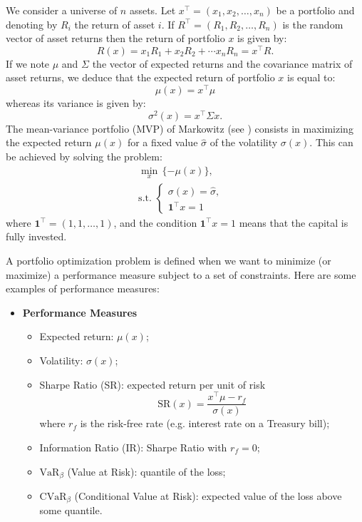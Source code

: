 We consider a universe of $n$ assets. Let $x^\top = (x_1, x_2, \dots, x_n)$ be a portfolio and denoting by $R_i$ the return of asset $i$. If $R^\top=(R_1, R_2, \dots, R_n)$  is the random vector of asset returns then the return of portfolio $x$ is given by:
\[
	R(x) = x_1R_1+x_2R_2+\cdots x_nR_n = x^\top R.
\]
If we note $\mu$ and $\Sigma$ the vector of expected returns and the covariance matrix of asset returns, we deduce that the expected return of portfolio $x$ is equal to:
\[
	\mu(x) = x^\top \mu
\]
whereas its variance is given by:
\[
	\sigma^2(x) = x^\top \Sigma x.
\]
The mean-variance portfolio (MVP) of Markowitz (see \cite{Markowitz1952}) consists in maximizing the expected return $\mu(x)$ for a fixed value $\hat{\sigma}$ of the volatility $\sigma(x)$. This can be achieved by solving the problem:
\begin{eqnarray}\label{prob:MVP}
	\min_{x} \, \{- \mu(x)\}, \\
	\mbox{s.t. }\left\{
	\begin{aligned}\nonumber
		\sigma(x) = \hat{\sigma}, & \\
		\mathbf{1}^\top x=1       &
	\end{aligned}
	\right.
\end{eqnarray}
where $\textbf{1}^\top =(1,1,\dots,1)$, and the condition $\mathbf{1}^\top x=1$ means that the capital is fully invested.

A portfolio optimization  problem is defined when we want to minimize (or maximize) a performance measure subject to a set of constraints. Here are some examples of performance measures:

\begin{itemize}
	\item \textbf{Performance Measures}
	      \begin{itemize}
		      \item Expected return: $\mu(x)$;
		      \item Volatility: $\sigma(x)$;
		      \item Sharpe Ratio (SR): expected return per unit of risk
		            \[
			            \mbox{SR}(x) = \frac{x^\top \mu - r_f}{\sigma(x)}
		            \]
		            where $r_f$ is the risk-free rate (e.g. interest rate on a Treasury bill);
		      \item Information Ratio (IR): Sharpe Ratio with $r_f=0$;
		      \item $\mbox{VaR}_\beta$ (Value at Risk): quantile of the loss;
		      \item $\mbox{CVaR}_\beta$ (Conditional Value at Risk): expected value of the loss above some quantile.
	      \end{itemize}
\end{itemize}

